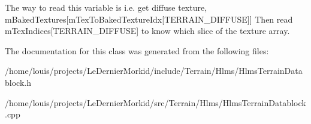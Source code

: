The way to read this variable is i.\+e. get diffuse texture, m\+Baked\+Textures\mbox{[}m\+Tex\+To\+Baked\+Texture\+Idx\mbox{[}T\+E\+R\+R\+A\+I\+N\+\_\+\+D\+I\+F\+F\+U\+SE\mbox{]}\mbox{]} Then read m\+Tex\+Indices\mbox{[}T\+E\+R\+R\+A\+I\+N\+\_\+\+D\+I\+F\+F\+U\+SE\mbox{]} to know which slice of the texture array. 

The documentation for this class was generated from the following files\+:\begin{DoxyCompactItemize}
\item 
/home/louis/projects/\+Le\+Dernier\+Morkid/include/\+Terrain/\+Hlms/Hlms\+Terrain\+Datablock.\+h\item 
/home/louis/projects/\+Le\+Dernier\+Morkid/src/\+Terrain/\+Hlms/Hlms\+Terrain\+Datablock.\+cpp\end{DoxyCompactItemize}

